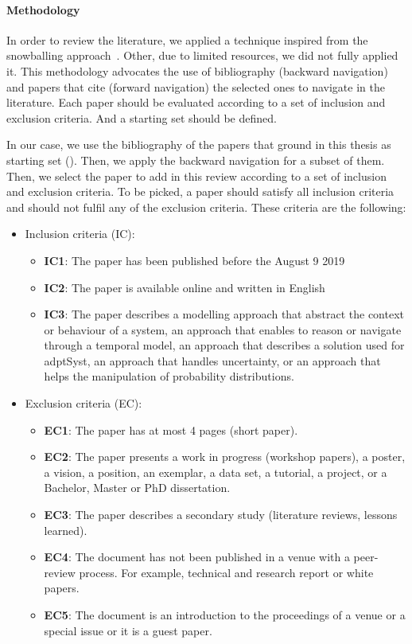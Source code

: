 \paragraph{Methodology}
In order to review the literature, we applied a technique inspired from the snowballing approach~\cite{DBLP:conf/ease/Wohlin14}.
Other, due to limited resources, we did not fully applied it.
This methodology advocates the use of bibliography (backward navigation) and papers that cite (forward navigation) the selected ones to navigate in the literature.
Each paper should be evaluated according to a set of inclusion and exclusion criteria.
And a starting set should be defined.

In our case, we use the bibliography of the papers that ground in this thesis as starting set (\cf {}).
Then, we apply the backward navigation for a subset of them.
Then, we select the paper to add in this review according to a set of inclusion and exclusion criteria.
To be picked, a paper should satisfy all inclusion criteria and should not fulfil any of the exclusion criteria.
These criteria are the following:
\begin{itemize}
	\item Inclusion criteria (IC):
	\begin{itemize}
		\item \textbf{IC1}: The paper has been published before the August 9 2019
		\item \textbf{IC2}: The paper is available online and written in English
		\item \textbf{IC3}: The paper describes a modelling approach that abstract the context or \gls{behaviour} of a system, an approach that enables to reason or navigate through a temporal model, an approach that describes a solution used for \gls{adptSyst}, an approach that handles uncertainty, or an approach that helps the manipulation of probability distributions. 
	\end{itemize}
	\item Exclusion criteria (EC):
	\begin{itemize}
		\item \textbf{EC1}: The paper has at most 4 pages (short paper).
		\item \textbf{EC2}: The paper presents a work in progress (workshop papers), a poster, a vision, a position, an exemplar, a data set, a tutorial, a project, or a Bachelor, Master or PhD dissertation.
		\item \textbf{EC3}: The paper describes a secondary study (\eg literature reviews, lessons learned).
		\item \textbf{EC4}: The document has not been published in a venue with a peer-review process. For example, technical and research report or white papers.
		\item \textbf{EC5}: The document is an introduction to the proceedings of a venue or a special issue or it is a guest paper.
	\end{itemize}
\end{itemize}

